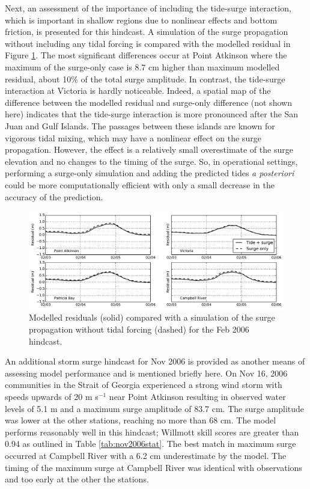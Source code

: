 \documentclass[pdftex,10pt]{article}
\begin{document}
Next, an assessment of the importance of including the tide-surge interaction, which is important in shallow regions due to nonlinear effects and bottom friction, is presented for this hindcast. A simulation of the surge propagation without including any tidal forcing is compared with the modelled residual in Figure \ref{fig:tidesurge}. The most significant differences occur at Point Atkinson where the maximum of the surge-only case is 8.7 cm higher than maximum modelled residual, about 10\% of the total surge amplitude.  In contrast, the tide-surge interaction at Victoria is hardly noticeable. Indeed, a spatial map of the difference between the modelled residual and surge-only difference (not shown here) indicates that the tide-surge interaction is more pronounced after the San Juan and Gulf Islands. The passages between these islands are known for vigorous tidal mixing, which may have a nonlinear effect on the surge propagation. However, the effect is a relatively small overestimate of the surge elevation and no changes to the timing of the surge. So, in operational settings, performing a surge-only simulation and adding the predicted tides \textit{a posteriori} could be more computationally efficient with only a small decrease in the accuracy of the prediction. 

\begin{figure}
\centering
\includegraphics[scale=0.6]{Figures/feb2006_tidesurge.pdf}
\caption{Modelled residuals (solid) compared with a simulation of the surge propagation without tidal forcing (dashed) for the Feb 2006 hindcast. }
\label{fig:tidesurge}
\end{figure}

An additional storm surge hindcast for Nov 2006 is provided as another means of assessing model performance and is mentioned briefly here. On Nov 16, 2006 communities in the Strait of Georgia experienced a strong wind storm with speeds upwards of 20 m s$^{-1}$ near Point Atkinson resulting in observed water levels of 5.1 m and a maximum surge amplitude of 83.7 cm. The surge amplitude was lower at the other stations, reaching no more than 68 cm. The model performs reasonably well in this hindcast; Willmott skill scores are greater than 0.94 as outlined in Table \ref{tab:nov2006stat}.  The best match in maximum surge occurred at Campbell River with a 6.2 cm underestimate by the model. The timing of the maximum surge at Campbell River was identical with observations and too early at the other the stations. 
\end{document}
